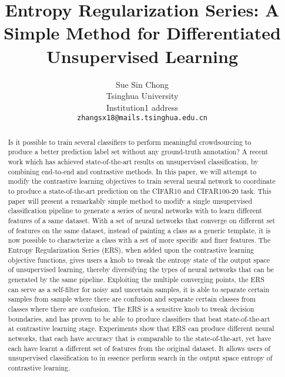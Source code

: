 \documentclass[10pt,twocolumn,letterpaper]{article}
\begin{document}
\title{Entropy Regularization Series: A Simple Method for Differentiated Unsupervised Learning}

\author{Sue Sin Chong\\
Tsinghua University\\
Institution1 address\\
{\tt\small zhangsx18@mails.tsinghua.edu.cn}


}

\maketitle
\ificcvfinal\thispagestyle{empty}\fi






\begin{abstract}
   Is it possible to train several classifiers to perform meaningful crowdsourcing to produce a better prediction label set without any ground-truth annotation? A recent work which has achieved state-of-the-art results on unsupervised classification, by combining end-to-end and contrastive methods. In this paper, we will attempt to modify the contrastive learning objectives to train several neural network to coordinate to produce a state-of-the-art prediction on the CIFAR10 and CIFAR100-20 task. This paper will present a remarkably simple method to modify a single unsupervised classification pipeline to generate a series of neural networks with to learn different features of a same dataset. With a set of neural networks that converge on different set of features on the same dataset, instead of painting a class as a generic template, it is now possible to characterize a class with a set of more specific and finer features. The Entropy Regularization Series (ERS), when added upon the contrastive learning objective functions, gives users a knob to tweak the entropy state of the output space of unsupervised learning, thereby diversifying the types of neural networks that can be generated by the same pipeline. Exploiting the multiple converging points, the ERS can serve as a self-filter for noisy and uncertain samples, it is able to separate certain samples from sample where there are confusion and separate certain classes from classes where there are confusion. The ERS is a sensitive knob to tweak decision boundaries, and has proven to be able to produce classifiers that beat state-of-the-art at contrastive learning stage. Experiments show that ERS can produce different neural networks, that each have accuracy that is comparable to the state-of-the-art, yet have each have learnt a different set of features from the original dataset. It allows users of unsupervised classification to in essence perform search in the output space entropy of contrastive learning. 
\end{abstract}
\end{document}

